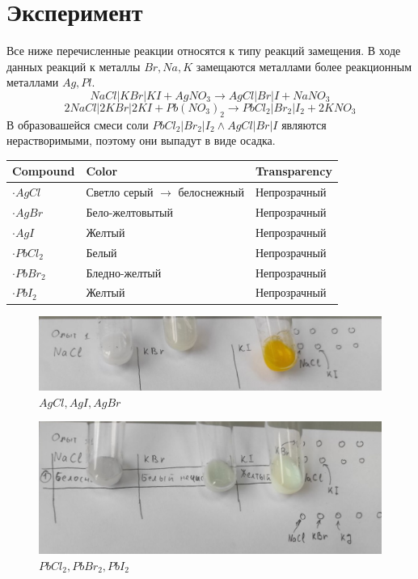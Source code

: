 \section{Эксперимент}
Все ниже перечисленные реакции относятся к типу 
реакций замещения. В ходе данных реакций к металлы 
$Br, Na, K$ замещаются металлами более реакционным 
металлами $Ag, Pl$. 
\begin{equation} 
    NaCl|KBr|KI + AgNO_3 \to  AgCl|Br|I + NaNO_3
\end{equation} 
\begin{equation} 
    2NaCl|2KBr|2KI + Pb(NO_3)_2 \to PbCl_2|Br_2|I_2  + 2 KNO_3
\end{equation} 
В образовашейся смеси соли $PbCl_2|Br_2|I_2 \land AgCl|Br|I$
являются нерастворимыми, поэтому они выпадут 
в виде осадка.

\begin{center}
\begin{tabular}{l||l||l}
    Compound & Color & Transparency \\ \hline \hline
    $\cdot AgCl$ & Светло серый $\to$ белоснежный & Непрозрачный \\
    $\cdot AgBr$ & Бело-желтовытый & Непрозрачный\\
    $\cdot AgI$ & Желтый & Непрозрачный\\
    $\cdot PbCl_2$ & Белый & Непрозрачный \\
    $\cdot PbBr_2$ & Бледно-желтый & Непрозрачный \\
    $\cdot PbI_2$ & Желтый & Непрозрачный \\
\end{tabular}
\end{center}

\begin{figure}[h]
    \centering
    \includegraphics[width=1\linewidth]{Ex_1/1.jpg}
     \caption{$AgCl, AgI, AgBr$}
    \label{ex_1_1}
\end{figure}

\begin{figure}[h]
    \centering
    \includegraphics[width=1\linewidth]{Ex_1/2.jpg}
     \caption{$PbCl_2, PbBr_2, PbI_2$}
    \label{ex_1_2}
\end{figure}